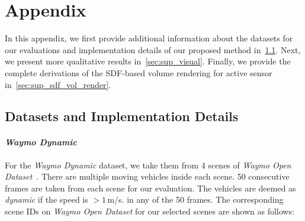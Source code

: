 \section{Appendix}
In this appendix, we first provide additional information about the datasets for our evaluations and implementation details of our proposed method in~\cref{sec:sup_dataset}. Next, we present more qualitative results in~\cref{sec:sup_visual}. Finally, we provide the complete derivations of the SDF-based volume rendering for active sensor in~\cref{sec:sup_sdf_vol_render}. 

\subsection{Datasets and Implementation Details}\label{sec:sup_dataset}
\paragraph{\textit{Waymo Dynamic}} For the \textit{Waymo Dynamic} dataset, we take them from 4 scenes of \textit{Waymo Open Dataset}~\cite{sun2020scalability}. There are multiple moving vehicles inside each scene. 50 consecutive frames are taken from each scene for our evaluation. The vehicles are deemed as \textit{dynamic} if the speed is $>1\,$m/s. in any of the 50 frames. The corresponding scene IDs on \textit{Waymo Open Dataset} for our selected scenes are shown as follows:

\begin{table}[!h]
    \setlength{\tabcolsep}{4pt}
    \renewcommand{\arraystretch}{1.2}
	\centering
\end{table}


